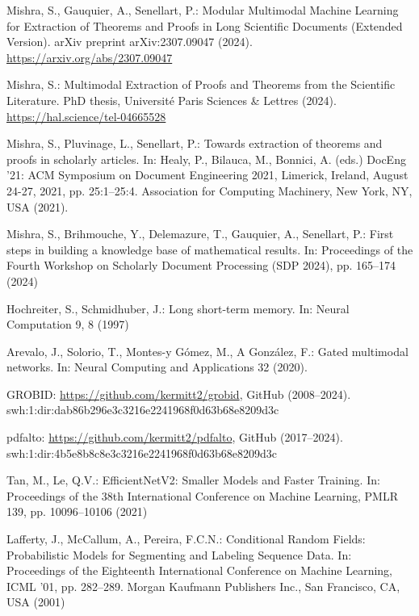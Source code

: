 \documentclass[runningheads]{llncs}
\begin{document}
\clearpage
\begin{thebibliography}{10}

	Mishra, S., Gauquier, A., Senellart, P.: Modular Multimodal Machine Learning for Extraction of Theorems and Proofs in Long Scientific Documents (Extended Version). arXiv preprint arXiv:2307.09047 (2024). \url{https://arxiv.org/abs/2307.09047}

	Mishra, S.: Multimodal Extraction of Proofs and Theorems from the Scientific Literature. PhD thesis, Universit{\'e} Paris Sciences \& Lettres (2024). \url{https://hal.science/tel-04665528}


	Mishra, S., Pluvinage, L., Senellart, P.: Towards extraction of theorems and proofs in scholarly articles. In: Healy, P., Bilauca, M., Bonnici, A. (eds.) DocEng '21: ACM Symposium on Document Engineering 2021, Limerick, Ireland, August 24-27, 2021, pp. 25:1--25:4. Association for Computing Machinery, New York, NY, USA (2021). 

	Mishra, S., Brihmouche, Y., Delemazure, T., Gauquier, A., Senellart, P.: First steps in building a knowledge base of mathematical results. In: Proceedings of the Fourth Workshop on Scholarly Document Processing (SDP 2024), pp. 165--174 (2024)

	Hochreiter, S., Schmidhuber, J.:  Long short-term memory. In: Neural Computation 9, 8 (1997)

	Arevalo, J., Solorio, T., Montes-y Gómez, M., A González, F.: Gated multimodal networks. In: Neural Computing and Applications 32 (2020).

	GROBID: \url{https://github.com/kermitt2/grobid}, GitHub (2008--2024). swh:1:dir:dab86b296e3c3216e2241968f0d63b68e8209d3c

	pdfalto: \url{https://github.com/kermitt2/pdfalto}, GitHub (2017--2024). swh:1:dir:4b5e8b8c8e3c3216e2241968f0d63b68e8209d3c

	Tan, M., Le, Q.V.: EfficientNetV2: Smaller Models and Faster Training. In: Proceedings of the 38th International Conference on Machine Learning, PMLR 139, pp. 10096--10106 (2021)

	Lafferty, J., McCallum, A., Pereira, F.C.N.: Conditional Random Fields: Probabilistic Models for Segmenting and Labeling Sequence Data. In: Proceedings of the Eighteenth International Conference on Machine Learning, ICML '01, pp. 282--289. Morgan Kaufmann Publishers Inc., San Francisco, CA, USA (2001)


\end{thebibliography}
\end{document}
